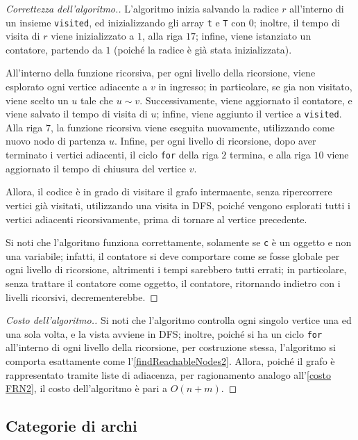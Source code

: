 \documentclass[a4paper, 12pt]{report}
\begin{document}
    \begin{proof}[Correttezza dell'algoritmo.]
        L'algoritmo inizia salvando la radice $r$ all'interno di un insieme \texttt{visited}, ed inizializzando gli array \texttt{t} e \texttt{T} con $0$; inoltre, il tempo di visita di $r$ viene inizializzato a $1$, alla riga $17$; infine, viene istanziato un contatore, partendo da $1$ (poiché la radice è già stata inizializzata).

        All'interno della funzione ricorsiva, per ogni livello della ricorsione, viene esplorato ogni vertice adiacente a $v$ in ingresso; in particolare, se gia non visitato, viene scelto un $u$ tale che $u \sim v$. Successivamente, viene aggiornato il contatore, e viene salvato il tempo di visita di $u$; infine, viene aggiunto il vertice a \texttt{visited}. Alla riga $7$, la funzione ricorsiva viene eseguita nuovamente, utilizzando come nuovo nodo di partenza $u$. Infine, per ogni livello di ricorsione, dopo aver terminato i vertici adiacenti, il ciclo \texttt{for} della riga $2$ termina, e alla riga $10$ viene aggiornato il tempo di chiusura del vertice $v$.

        Allora, il codice è in grado di visitare il grafo intermaente, senza ripercorrere vertici già visitati, utilizzando una visita in DFS, poiché vengono esplorati tutti i vertici adiacenti ricorsivamente, prima di tornare al vertice precedente.

        Si noti che l'algoritmo funziona correttamente, solamente se \texttt{c} è un oggetto e non una variabile; infatti, il contatore si deve comportare come se fosse globale per ogni livello di ricorsione, altrimenti i tempi sarebbero tutti errati; in particolare, senza trattare il contatore come oggetto, il contatore, ritornando indietro con i livelli ricorsivi, decrementerebbe.
    \end{proof}

    \begin{proof}[Costo dell'algoritmo.]
        Si noti che l'algoritmo controlla ogni singolo vertice una ed una sola volta, e la vista avviene in DFS; inoltre, poiché si ha un ciclo \texttt{for} all'interno di ogni livello della ricorsione, per costruzione stessa, l'algoritmo si comporta esattamente come l'\cref{findReachableNodes2}. Allora, poiché il grafo è rappresentato tramite liste di adiacenza, per ragionamento analogo all'\cref{costo FRN2}, il costo dell'algoritmo è pari a $O(n + m)$.
    \end{proof}

    \subsection{Categorie di archi}
\end{document}
